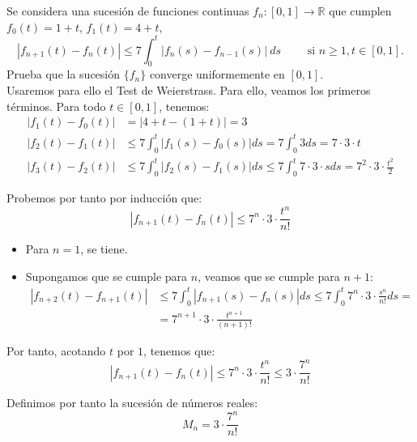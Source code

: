 \documentclass[12pt]{article}
\begin{document}
    \begin{ejercicio}
        Se considera una sucesión de funciones continuas $f_n:[0,1]\rightarrow\mathbb{R}$ que cumplen $f_0(t)=1+t$, $f_1(t)=4+t$,
        \begin{equation*}
            |f_{n+1}(t) - f_n(t)| \leq 7 \int_{0}^{t} |f_n(s)-f_{n-1}(s)|~ds \qquad \text{\ si\ } n\geq 1, t\in [0,1].
        \end{equation*}
        Prueba que la sucesión $\{f_n\}$ converge uniformemente en $[0,1]$.\\

        Usaremos para ello el Test de Weierstrass. Para ello, veamos los primeros términos. Para todo $t\in [0,1]$, tenemos:
        \begin{align*}
            |f_1(t)-f_0(t)|&=|4+t-(1+t)|=3\\
            |f_2(t)-f_1(t)|&\leq 7\int_{0}^{t}|f_1(s)-f_0(s)|ds=7\int_{0}^{t}3ds=7\cdot 3\cdot t \\
            |f_3(t)-f_2(t)|&\leq 7\int_{0}^{t}|f_2(s)-f_1(s)|ds\leq 7\int_{0}^{t}7\cdot 3\cdot sds=7^2\cdot 3\cdot \frac{t^2}{2}
        \end{align*}

        Probemos por tanto por inducción que:
        \begin{equation*}
            |f_{n+1}(t)-f_n(t)|\leq 7^n\cdot 3\cdot \frac{t^n}{n!}
        \end{equation*}
        \begin{itemize}
            \item Para $n=1$, se tiene.
            \item Supongamos que se cumple para $n$, veamos que se cumple para $n+1$:
            \begin{align*}
                |f_{n+2}(t)-f_{n+1}(t)|&\leq 7\int_{0}^{t}|f_{n+1}(s)-f_n(s)|ds
                \leq 7\int_{0}^{t}7^n\cdot 3\cdot \frac{s^n}{n!}ds
                =\\&= 7^{n+1}\cdot 3\cdot \frac{t^{n+1}}{(n+1)!}
            \end{align*}
        \end{itemize}

        Por tanto, acotando $t$ por $1$, tenemos que:
        \begin{equation*}
            |f_{n+1}(t)-f_n(t)|\leq 7^n\cdot 3\cdot \frac{t^n}{n!}
            \leq 3\cdot \frac{7^n}{n!}
        \end{equation*}

        Definimos por tanto la sucesión de números reales:
        \begin{equation*}
            M_n=3\cdot \frac{7^n}{n!}
        \end{equation*}


\end{ejercicio}
\end{document}
